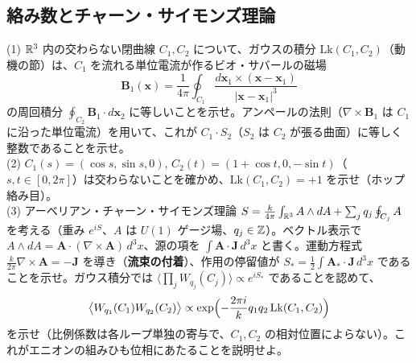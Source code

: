 \subsection{絡み数とチャーン・サイモンズ理論}

\begin{problem}[難易度 D]\label{ch06-prob-cs}
(1) $\mathbb{R}^3$ 内の交わらない閉曲線 $C_1,C_2$ について、ガウスの積分 $\mathrm{Lk}(C_1,C_2)$（動機の節）は、$C_1$ を流れる単位電流が作るビオ・サバールの磁場
\[
\bm B_1(\bm x)=\frac1{4\pi}\oint_{C_1}\frac{d\bm x_1\times(\bm x-\bm x_1)}{\lvert\bm x-\bm x_1\rvert^3}
\]
の周回積分 $\oint_{C_2}\bm B_1\cdot d\bm x_2$ に等しいことを示せ。アンペールの法則（$\nabla\times\bm B_1$ は $C_1$ に沿った単位電流）を用いて、これが $C_1\cdot S_2$（$S_2$ は $C_2$ が張る曲面）に等しく整数であることを示せ。\\
(2) $C_1(s)=(\cos s,\sin s,0)$, $C_2(t)=(1+\cos t,0,-\sin t)$（$s,t\in[0,2\pi]$）は交わらないことを確かめ、$\mathrm{Lk}(C_1,C_2)=+1$ を示せ（ホップ絡み目）。\\
(3) アーベリアン・チャーン・サイモンズ理論 $S=\frac k{4\pi}\int_{\mathbb{R}^3}A\wedge dA+\sum_jq_j\oint_{C_j}A$ を考える（重み $e^{iS}$、$A$ は $U(1)$ ゲージ場、$q_j\in\mathbb{Z}$）。ベクトル表示で $A\wedge dA=\bm A\cdot(\nabla\times\bm A)\,d^3x$、源の項を $\int\bm A\cdot\bm J\,d^3x$ と書く。運動方程式 $\frac k{2\pi}\nabla\times\bm A=-\bm J$ を導き（\textbf{流束の付着}）、作用の停留値が $S_*=\frac12\int\bm A_*\cdot\bm J\,d^3x$ であることを示せ。ガウス積分では $\langle\prod_jW_{q_j}(C_j)\rangle\propto e^{iS_*}$ であることを認めて、
\[
\bigl\langle W_{q_1}(C_1)W_{q_2}(C_2)\bigr\rangle\propto\exp\Bigl(-\frac{2\pi i}{k}q_1q_2\,\mathrm{Lk}(C_1,C_2)\Bigr)
\]
を示せ（比例係数は各ループ単独の寄与で、$C_1,C_2$ の相対位置によらない）。これがエニオンの組みひも位相にあたることを説明せよ。
\end{problem}


